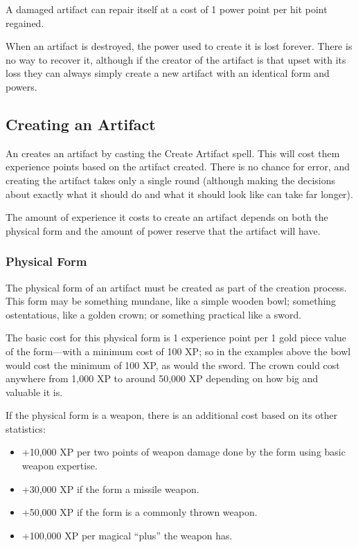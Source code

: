 \begin{multicols*}{2}
A damaged artifact can repair itself at a cost of 1 power point per hit point regained.

When an artifact is destroyed, the power used to create it is lost forever. There is no way to recover it, although if the creator of the artifact is that upset with its loss they can always simply create a new artifact with an identical form and powers.

\subsection{Creating an Artifact}
An  creates an artifact by casting the Create Artifact spell. This will cost them experience points based on the artifact created. There is no chance for error, and creating the artifact takes only a single round (although making the decisions about exactly what it should do and what it should look like can take far longer).

The amount of experience it costs to create an artifact depends on both the physical form and the amount of power reserve that the artifact will have.

\subsubsection{Physical Form}
The physical form of an artifact must be created as part of the creation process. This form may be something mundane, like a simple wooden bowl; something ostentatious, like a golden crown; or something practical like a sword.

The basic cost for this physical form is 1 experience point per 1 gold piece value of the form—with a minimum cost of 100 XP; so in the examples above the bowl would cost the minimum of 100 XP, as would the sword. The crown could cost anywhere from 1,000 XP to around 50,000 XP depending on how big and valuable it is.

If the physical form is a weapon, there is an additional cost based on its other statistics:

\begin{itemize}
 \item{+10,000 XP per two points of weapon damage done by the form using basic weapon expertise.}
 \item{+30,000 XP if the form a missile weapon.}
 \item{+50,000 XP if the form is a commonly thrown weapon.}
 \item{+100,000 XP per magical “plus” the weapon has.}
\end{itemize}


\end{multicols*}
